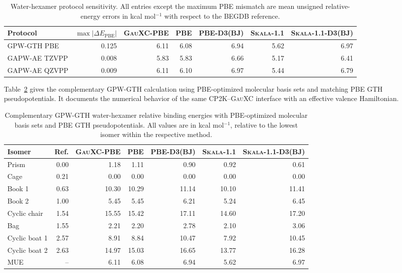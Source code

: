 \documentclass[10pt]{article}
\newcommand{\Skala}{\textsc{Skala}}
\newcommand{\GauXC}{\textsc{GauXC}}
\newcommand{\CPtwoK}{\textsc{CP2K}}
\newcommand{\GPW}{\textsc{GPW}}
\newcommand{\GAPW}{\textsc{GAPW}}
\newcommand{\GTH}{\textsc{GTH}}
\newcommand{\GPWGTH}{\GPW{}-\GTH{}}
\newcommand{\GAPWAE}{\GAPW{}-AE}
\newcommand{\SITableFont}{\normalsize}
\begin{document}
\begin{table}[htbp]
\centering
\SITableFont
\setlength{\tabcolsep}{3pt}
\caption{Water-hexamer protocol sensitivity.  All entries except the maximum PBE mismatch are mean unsigned relative-energy errors in kcal mol\(^{-1}\) with respect to the BEGDB reference.}
\label{tab:si_hexamer_sensitivity}
\begin{tabular}{lrrrrrr}
\hline
Protocol & \(\max|\Delta E_{\mathrm{PBE}}|\) & \GauXC{}-PBE & PBE & PBE-D3(BJ) & \Skala{}-1.1 & \Skala{}-1.1-D3(BJ)\\
\hline
\GPWGTH{} PBE & 0.125 & 6.11 & 6.08 & 6.94 & 5.62 & 6.97\\
\GAPWAE{} TZVPP & 0.008 & 5.83 & 5.83 & 6.66 & 5.17 & 6.41\\
\GAPWAE{} QZVPP & 0.009 & 6.11 & 6.10 & 6.97 & 5.44 & 6.79\\
\hline
\end{tabular}
\end{table}

Table~\ref{tab:si_gpw_hexamer} gives the complementary \GPWGTH{} calculation using PBE-optimized molecular basis sets and matching PBE \GTH{} pseudopotentials.  It documents the numerical behavior of the same \CPtwoK{}--\GauXC{} interface with an effective valence Hamiltonian.

\begin{table}[htbp]
\centering
\SITableFont
\setlength{\tabcolsep}{3pt}
\caption{Complementary \GPWGTH{} water-hexamer relative binding energies with PBE-optimized molecular basis sets and PBE \GTH{} pseudopotentials.  All values are in kcal mol\(^{-1}\), relative to the lowest isomer within the respective method.}
\label{tab:si_gpw_hexamer}
\begin{tabular}{lrrrrrr}
\hline
Isomer & Ref. & \GauXC{}-PBE & PBE & PBE-D3(BJ) & \Skala{}-1.1 & \Skala{}-1.1-D3(BJ)\\
\hline
Prism & 0.00 & 1.18 & 1.11 & 0.90 & 0.92 & 0.61\\
Cage & 0.21 & 0.00 & 0.00 & 0.00 & 0.00 & 0.00\\
Book 1 & 0.63 & 10.30 & 10.29 & 11.14 & 10.10 & 11.41\\
Book 2 & 1.00 & 5.45 & 5.45 & 6.21 & 5.24 & 6.45\\
Cyclic chair & 1.54 & 15.55 & 15.42 & 17.11 & 14.60 & 17.20\\
Bag & 1.55 & 2.21 & 2.20 & 2.78 & 2.10 & 3.06\\
Cyclic boat 1 & 2.57 & 8.91 & 8.84 & 10.47 & 7.92 & 10.45\\
Cyclic boat 2 & 2.63 & 14.97 & 15.03 & 16.65 & 13.77 & 16.28\\
\hline
MUE & -- & 6.11 & 6.08 & 6.94 & 5.62 & 6.97\\
\hline
\end{tabular}
\end{table}
\end{document}
